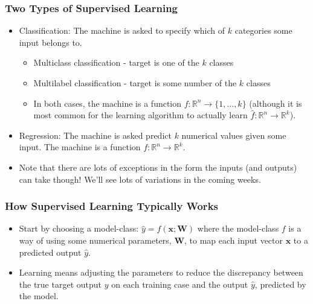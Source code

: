 \documentclass[\beamerclass]{beamer}
\begin{document}

\begin{frame}[fragile]\frametitle{Two Types of Supervised Learning}
\begin{itemize}
\item<+-> Classification:  The machine is asked to specify which of $k$ categories some input belongs to.
\begin{itemize}
  \item Multiclass classification - target is one of the $k$ classes
  \item Multilabel classification - target is some number of the $k$ classes
  \item In both cases, the machine is a function $f : \mathbb{R}^n \rightarrow \{1, ..., k\}$ (although it is most common for the learning algorithm to actually learn $\hat f : \mathbb{R}^n \rightarrow \mathbb{R}^k$).
\end{itemize}
\item<+-> Regression:  The machine is asked predict $k$ numerical values given some input. The machine is a function $f: \mathbb{R}^n \rightarrow \mathbb{R}^k$.
\item<+-> Note that there are lots of exceptions in the form the inputs (and outputs) can take though! We'll see lots of variations in the coming weeks.
\end{itemize}
\end{frame}


\begin{frame}[fragile]\frametitle{How Supervised Learning Typically Works}
\begin{itemize}
\item Start by choosing a model-class: $\hat y = f(\bm x; \bm W)$ where the model-class $f$ is a way of using some numerical parameters, $\bm W$, to map each input vector $\bm x$ to a predicted output $ \hat y$.
\item Learning means adjusting the parameters to reduce the discrepancy between the true target output $y$ on each training case and the output $\hat y$, predicted by the model. %
\end{itemize}

\end{frame}

\end{document}
